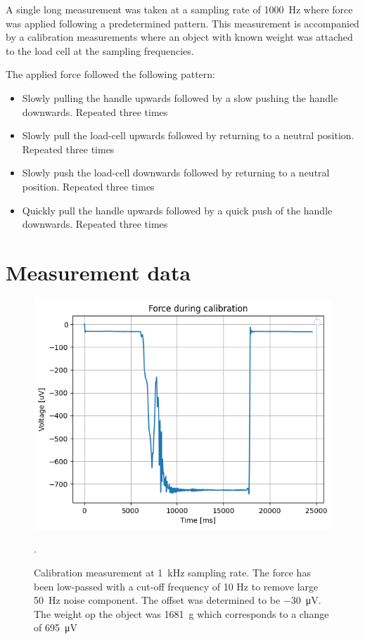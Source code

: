 A single long measurement was taken at a sampling rate of \SI{1000}{\hertz} where force was applied following a predetermined pattern. This measurement is accompanied by a calibration measurements where an object with known weight was attached to the load cell at the sampling frequencies.

The applied force followed the following pattern:
\begin{itemize}
    \item Slowly pulling the handle upwards followed by a slow pushing the handle downwards. Repeated three times
    \item Slowly pull the load-cell upwards followed by returning to a neutral position. Repeated three times
    \item Slowly push the load-cell downwards followed by returning to a neutral position. Repeated three times
    \item Quickly pull the handle upwards followed by a quick push of the handle downwards. Repeated three times
\end{itemize}

\section{Measurement data}

\begin{figure}[h!t]
	\begin{center}
		\includegraphics[width=0.8\columnwidth]{images/measurement_calibratie3_1k.png}
	\end{center}
	\caption{Calibration measurement at \SI{1}{\kilo\hertz} sampling rate. The force has been low-passed with a cut-off frequency of 10 Hz to remove large \SI{50}{\hertz} noise component. The offset was determined to be \SI{-30}{\micro\volt}. The weight op the object was \SI{1681}{\gram} which corresponds to a change of \SI{695}{\micro\volt}}.
	\label{fig:calibration_1k}
\end{figure}

